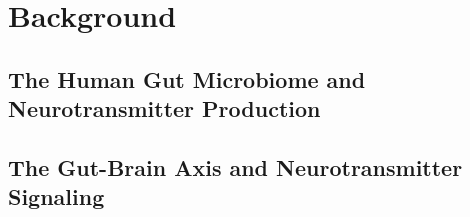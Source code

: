 \section{Background}
\label{sec:background}


\subsection{The Human Gut Microbiome and Neurotransmitter Production}

\subsection{The Gut-Brain Axis and Neurotransmitter Signaling}
\label{subsec:gut_brain}

